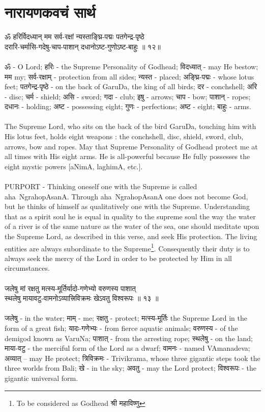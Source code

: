 \section{\color{blue}\sanskrit नारायणकवचं सार्थ}
\sanskrit
ॐ हरिर्विदध्यान् मम सर्व-रक्षां न्यस्ताङ्घ्रि-पद्मः पतगेन्द्र-पृष्ठे\\
दरारि-चर्मासि-गदेषु-चाप-पाशान् दधानोऽष्ट-गुणोऽष्ट-बाहुः ॥ १२॥\\
\\
ॐ - O Lord;  हरिः - the Supreme Personality of Godhead;  विदध्यात् - may He bestow;  मम  my;  सर्व-रक्षाम् - protection from all sides;  न्यस्त - placed;  अङ्घ्रि-पद्मः - whose lotus feet; पतगेन्द्र-पृष्ठे - on the back of GaruDa, the king of all birds; दर - conchshell;  अरि -   disc;  चर्म - shield;  असि - sword;  गदा - club;  इषु - arrows;  चाप - bow;  पाशान् - ropes;  दधानः - holding;  अष्ट - possessing eight;  गुणः - perfections;  अष्ट - eight;  बाहुः - arms.\\
\\
The Supreme Lord, who sits on the back of the bird GaruDa, touching him with His lotus feet, holds eight weapons : the conchshell, disc, shield, sword, club, arrows, bow and ropes. May that Supreme Personality of Godhead protect me at all times with His eight arms. He is all-powerful because He fully possesses the eight mystic powers [aNimA, laghimA, etc.].\\
\\
PURPORT - Thinking oneself one with the Supreme is called aha~NgrahopAsanA. Through aha~NgrahopAsanA one does not become God, but he thinks of himself as qualitatively one with the Supreme. Understanding that as a spirit soul he is equal in quality to the supreme soul the way the water of a river is of the same nature as the water of the sea, one should meditate upon the Supreme Lord, as described in this verse, and seek His protection. The living entities are always subordinate to the Supreme\footnote{To be considered as Godhead {\sanskrit  श्री महाविष्णु}}. Consequently their duty is to always seek the mercy of the Lord in order to be protected by Him in all circumstances.\\
\\
जलेषु मां रक्षतु मत्स्य-मूर्तिर्यादो-गणेभ्यो वरुणस्य पाशात्\\
स्थलेषु मायावटु-वामनोऽव्यात्त्रिविक्रमः खेऽवतु विश्वरूपः ॥ १३ ॥\\
\\
जलेषु - in the water;  माम् - me;  रक्षतु - protect;  मत्स्य-मूर्तिः  the Supreme Lord in the form of a great fish;  यादः-गणेभ्यः - from fierce aquatic animals;  वरुणस्य - of the demigod known as VaruNa;  पाशात् - from the arresting rope; स्थलेषु - on the land;  माया-वटु - the merciful form of the Lord as a dwarf;  वामनः - named VAmanadeva;  अव्यात् – may He protect;  त्रिविक्रमः - Trivikrama, whose three gigantic steps took the three worlds from Bali;  खे - in the sky;  अवतु - may the Lord protect;  विश्वरूपः - the gigantic universal form.\\
